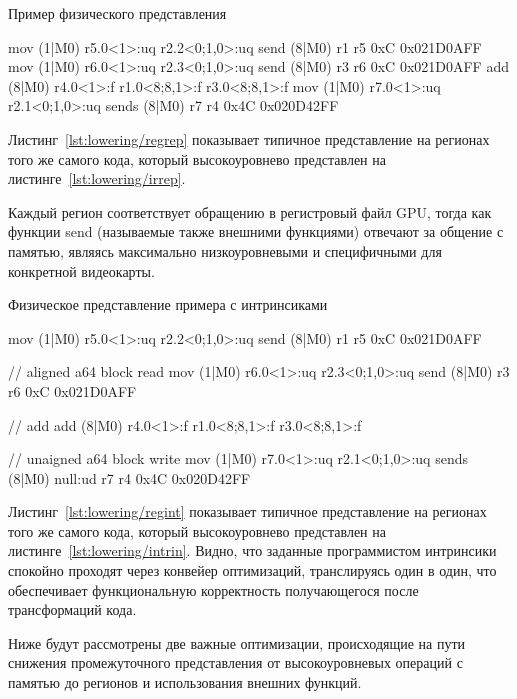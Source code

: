 \begin{ListingEnv}[!h]
    \captiondelim{ } 
    \caption{Пример физического представления}\label{lst:lowering/regrep}
    \begin{Verb}
mov (1|M0) r5.0<1>:uq r2.2<0;1,0>:uq
send (8|M0) r1 r5 0xC 0x021D0AFF
mov (1|M0) r6.0<1>:uq r2.3<0;1,0>:uq
send (8|M0) r3 r6 0xC 0x021D0AFF
add (8|M0) r4.0<1>:f r1.0<8;8,1>:f r3.0<8;8,1>:f
mov (1|M0) r7.0<1>:uq r2.1<0;1,0>:uq
sends (8|M0) r7 r4 0x4C 0x020D42FF
    \end{Verb}
\end{ListingEnv}

Листинг~\cref{lst:lowering/regrep} показывает типичное представление на регионах того же самого кода, который высокоуровнево представлен на листинге~\cref{lst:lowering/irrep}.

Каждый регион соответствует обращению в регистровый файл GPU, тогда как функции send (называемые также внешними функциями) отвечают за общение с памятью, являясь максимально низкоуровневыми и специфичными для конкретной видеокарты.

\begin{ListingEnv}[!h]
    \captiondelim{ } 
    \caption{Физическое представление примера с интринсиками}\label{lst:lowering/regint}
    \begin{Verb}
mov (1|M0)  r5.0<1>:uq r2.2<0;1,0>:uq
send (8|M0) r1 r5 0xC 0x021D0AFF

// aligned a64 block read 
mov (1|M0) r6.0<1>:uq r2.3<0;1,0>:uq 
send (8|M0) r3 r6 0xC 0x021D0AFF

// add
add (8|M0) r4.0<1>:f r1.0<8;8,1>:f r3.0<8;8,1>:f

// unaigned a64 block write
mov (1|M0) r7.0<1>:uq r2.1<0;1,0>:uq
sends (8|M0) null:ud r7 r4 0x4C 0x020D42FF
    \end{Verb}
\end{ListingEnv}

Листинг~\cref{lst:lowering/regint} показывает типичное представление на регионах того же самого кода, который высокоуровнево представлен на листинге~\cref{lst:lowering/intrin}. Видно, что заданные программистом интринсики спокойно проходят через конвейер оптимизаций, транслируясь один в один, что обеспечивает функциональную корректность получающегося после трансформаций кода.

Ниже будут рассмотрены две важные оптимизации, происходящие на пути снижения промежуточного представления от высокоуровневых операций с памятью до регионов и использования внешних функций.

